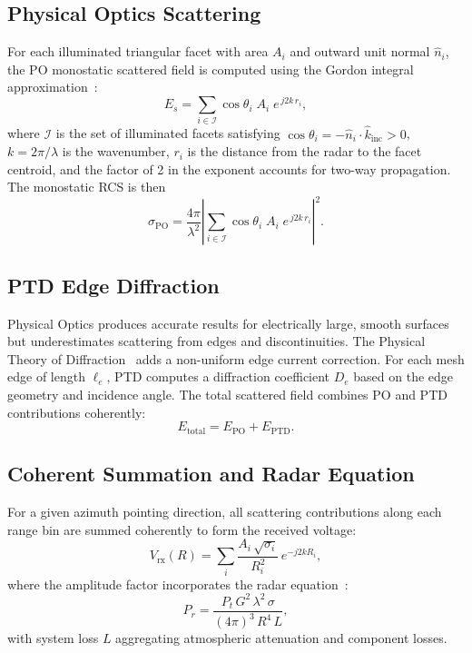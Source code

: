 \documentclass[conf]{new-aiaa}
\begin{document}
\subsection{Physical Optics Scattering}
For each illuminated triangular facet with area $A_i$ and outward unit normal $\hat{n}_i$, the PO monostatic scattered field is computed using the Gordon integral approximation~\cite{Gordon1975}:
\begin{equation}\label{eq:po}
E_s = \sum_{i \in \mathcal{I}} \cos\theta_i \; A_i \; e^{\,j2k\,r_i},
\end{equation}
where $\mathcal{I}$ is the set of illuminated facets satisfying $\cos\theta_i = -\hat{n}_i \cdot \hat{k}_{\mathrm{inc}} > 0$, $k = 2\pi/\lambda$ is the wavenumber, $r_i$ is the distance from the radar to the facet centroid, and the factor of 2 in the exponent accounts for two-way propagation. The monostatic RCS is then
\begin{equation}\label{eq:rcs_po}
\sigma_{\mathrm{PO}} = \frac{4\pi}{\lambda^2}\left|\sum_{i \in \mathcal{I}} \cos\theta_i \; A_i \; e^{\,j2k\,r_i}\right|^2.
\end{equation}

\subsection{PTD Edge Diffraction}
Physical Optics produces accurate results for electrically large, smooth surfaces but underestimates scattering from edges and discontinuities. The Physical Theory of Diffraction~\cite{Ufimtsev2007} adds a non-uniform edge current correction. For each mesh edge of length $\ell_e$, PTD computes a diffraction coefficient $D_e$ based on the edge geometry and incidence angle. The total scattered field combines PO and PTD contributions coherently:
\begin{equation}\label{eq:total_field}
E_{\mathrm{total}} = E_{\mathrm{PO}} + E_{\mathrm{PTD}}.
\end{equation}

\subsection{Coherent Summation and Radar Equation}
For a given azimuth pointing direction, all scattering contributions along each range bin are summed coherently to form the received voltage:
\begin{equation}\label{eq:vrx}
V_{\mathrm{rx}}(R) = \sum_{i} \frac{A_i\,\sqrt{\sigma_i}}{R_i^2}\, e^{-j2kR_i},
\end{equation}
where the amplitude factor incorporates the radar equation~\cite{Skolnik2008}:
\begin{equation}\label{eq:radar_eq}
P_r = \frac{P_t\, G^2\, \lambda^2\, \sigma}{(4\pi)^3\, R^4\, L},
\end{equation}
with system loss $L$ aggregating atmospheric attenuation and component losses.
\end{document}
